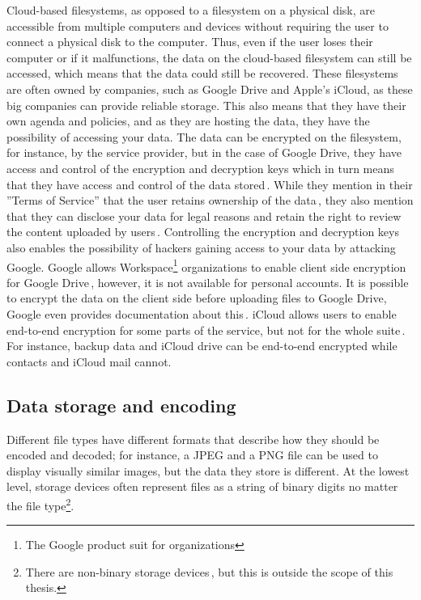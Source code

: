 Cloud-based filesystems, as opposed to a filesystem on a physical disk, are accessible from multiple computers and devices without requiring the user to connect a physical disk to the computer. Thus, even if the user loses their computer or if it malfunctions, the data on the \mbox{cloud-based} filesystem can still be accessed, which means that the data could still be recovered. These filesystems are often owned by companies, such as Google Drive and Apple's iCloud, as these big companies can provide reliable storage. This also means that they have their own agenda and policies, and as they are hosting the data, they have the possibility of accessing your data. The data can be encrypted on the filesystem, for instance, by the service provider, but in the case of Google Drive, they have access and control of the encryption and decryption keys which in turn means that they have access and control of the data stored\,\cite{johnsonGoogleDriveSecure2021}. While they mention in their ''Terms of Service'' that the user retains ownership of the data\,\cite{googleGoogleDriveTerms}, they also mention that they can disclose your data for legal reasons and retain the right to review the content uploaded by users\,\cite{googleGoogleTermsService}. Controlling the encryption and decryption keys also enables the possibility of hackers gaining access to your data by attacking Google. Google allows Workspace\footnote{The Google product suit for organizations} organizations to enable client side encryption for Google Drive\,\cite{googleGetStartedEncrypted}, however, it is not available for personal accounts. It is possible to encrypt the data on the client side before uploading files to Google Drive, Google even provides documentation about this\,\cite{googleClientsideEncryptionKeys2023}. iCloud allows users to enable \mbox{end-to-end} encryption for some parts of the service, but not for the whole suite\,\cite{appleinc.ICloudDataSecurity}. For instance, backup data and iCloud drive can be \mbox{end-to-end} encrypted while contacts and iCloud mail cannot.

\subsection{Data storage and encoding}
\label{sec:data_storage}
Different file types have different formats that describe how they should be encoded and decoded; for instance, a JPEG and a PNG file can be used to display visually similar images, but the data they store is different. At the lowest level, storage devices often represent files as a string of binary digits no matter the file type\footnote{There are \mbox{non-binary} storage devices\,\cite{MultistateDataStorage2020}, but this is outside the scope of this thesis.}.

